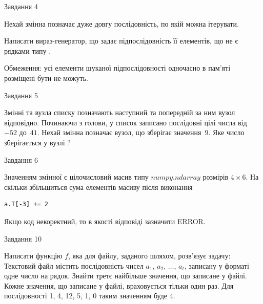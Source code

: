 \documentclass[12pt, ukrainian]{article}
\begin{document}
{               
{\begin{center}Завдання {4}\end{center}}
\vspace{-6mm}
Нехай змінна  позначає дуже довгу послідовність, по якій можна ітерувати.

Написати вираз-генератор, що задає підпослідовність її елементів, що не є рядками типу .

Обмеження: усі елементи шуканої підпослідовності одночасно в пам'яті розміщені бути не можуть.\par

\vspace{10mm}
               
{\begin{center}Завдання {5}\end{center}}
\vspace{-6mm}
Змінні  та  вузла списку позначають наступний та попередній за ним вузол відповідно. Починаючи з голови, у список записано послідовні цілі числа від~$-52$ до~$41$. Нехай змінна  позначає вузол, що зберігає значення~$9$.
Яке число зберігається у вузлі  ?\par

               
{\begin{center}Завдання {6}\end{center}}
\vspace{-6mm}
Значенням змінної  є цілочисловий масив типу $numpy.ndarray$ розмірів $4{\times}6$. На скільки збільшиться сума елементів масиву  після виконання
\begin{verbatim}
a.T[-3] += 2
\end{verbatim}


Якщо код некоректний, то в якості відповіді зазначити ERROR.\par

               
{\begin{center}Завдання {10}\end{center}}
\vspace{-6mm}

Написати функцію $f$, яка для файлу, заданого шляхом, розв’язує задачу:\\ Текстовий файл містить послідовність чисел $a_1$, $a_2$, $\ldots$, $a_t$, записану у форматі одне число на рядок. Знайти третє найбільше значення, що записане у файлі. Кожне значення, що записане у файлі, враховується тільки один раз. Для послідовності 1, 4, 12, 5, 1, 0 таким значенням буде 4.

}
\end{document}
